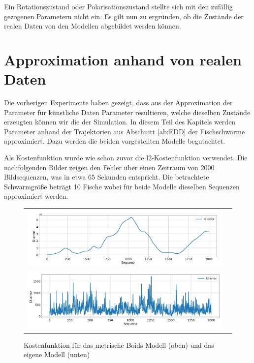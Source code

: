 Ein Rotationszustand oder Polarisationszustand stellte sich mit den zufällig gezogenen Parametern nicht ein.
Es gilt nun zu ergründen, ob die Zustände der realen Daten von den Modellen abgebildet werden können.

\section{Approximation anhand von realen Daten}

Die vorherigen Experimente haben gezeigt, dass aus der Approximation der Parameter für künstliche Daten Parameter resultieren, welche dieselben Zustände erzeugten können wir die der Simulation. In diesem Teil des Kapitels werden Parameter anhand der Trajektorien aus Abschnitt \ref{ab:EDD} der Fischschwärme approximiert. Dazu werden die beiden vorgestellten Modelle begutachtet.

 Als Kostenfunktion wurde wie schon zuvor die l2-Kostenfunktion verwendet. Die nachfolgenden Bilder zeigen den Fehler über einen Zeitraum von 2000 Bildsequenzen, was in etwa 65 Sekunden entspricht. Die betrachtete Schwarmgröße beträgt 10 Fische wobei für beide Modelle dieselben Sequenzen approximiert werden.

\begin{figure}[H]
\centering
\begin{tabular}{cc}
\includegraphics[width=1.0\textwidth]{figures/Experimente/Realdaten/Boidsl2Fehler_10Fische.png} \\
\includegraphics[width=1.0\textwidth]{figures/Experimente/Realdaten/PWD2Fehler_10Fische.png}  
\end{tabular}
\caption{Kostenfunktion für das metrische Boids Modell (oben) und das eigene Modell (unten)\label{fig:10Fisch}}
\end{figure}

